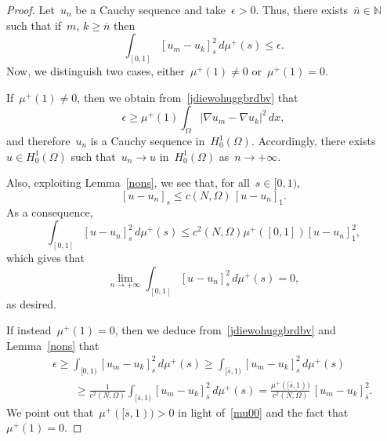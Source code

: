 \documentclass[12pt,a4paper,intlimits,sumlimits]{amsart}
\def \N {\mathbb{N}}
\theoremstyle{definition}
\theoremstyle{plain}
\numberwithin{equation}{section}
\renewcommand{\le}{\leqslant}
\renewcommand{\ge}{\geqslant}
\begin{document}
\begin{proof}
Let~$u_n$ be a Cauchy sequence and take~$\epsilon>0$.
Thus, there exists~$\overline{n}\in\N$ such that if~$m$, $k\ge \overline{n}$ then
\begin{equation}\label{jdiewohuggbrdbv}
\int_{[{{ 0 }}, 1]} [u_m-u_k]^2_{s}\, d\mu^+ (s)\le\epsilon.\end{equation}
Now, we distinguish two cases, either~$\mu^+(1)\neq0$
or~$\mu^+(1)=0$.

If~$\mu^+(1)\neq0$, then we obtain from~\eqref{jdiewohuggbrdbv} that
$$\epsilon\ge \mu^+(1)\int_{\Omega}|\nabla u_m-\nabla u_k|^2\,dx,$$
and therefore~$u_n$ is a Cauchy sequence in~$H^1_0(\Omega)$.
Accordingly, there exists~$u\in H^1_0(\Omega)$ such that~$u_n\to u$
in~$H^1_0(\Omega)$ as~$n\to+\infty$. 

Also, exploiting Lemma~\ref{nons}, we see that, for all~$s\in[0,1)$,
$$ [u-u_n]_{s}\le c(N,\Omega) \, [u-u_n]_{1}.$$
As a consequence,
$$ \int_{[0,1]}[u-u_n]_s^2\,d\mu^+(s)
\le c^2(N,\Omega) \mu^+([0,1]) [u-u_n]_{1}^2,$$
which gives that
$$ \lim_{n\to+\infty} \int_{[0,1]}[u-u_n]_s^2\,d\mu^+(s)=0,$$
as desired.

If instead~$\mu^+(1)=0$, then we deduce from~\eqref{jdiewohuggbrdbv}
and Lemma~\ref{nons} that
\begin{eqnarray*}&&\epsilon\ge
\int_{[{{ 0 }}, 1)} [u_m-u_k]^2_{s}\, d\mu^+ (s)\ge 
\int_{[\overline{s}, 1)} [u_m-u_k]^2_{s}\, d\mu^+ (s)\\&&\qquad
\ge \frac{1}{c^2(N,\Omega)}
\int_{[\overline{s}, 1)} [u_m-u_k]^2_{\overline{s}}\, d\mu^+ (s)
=\frac{\mu^+([\overline{s}, 1))}{c^2(N,\Omega)}\,
[u_m-u_k]^2_{\overline{s}}
.\end{eqnarray*}
We point out that~$\mu^+([\overline{s}, 1))>0$ in light of~\eqref{mu00}
and the fact that~$\mu^+(1)=0$.


\end{proof}
\end{document}
